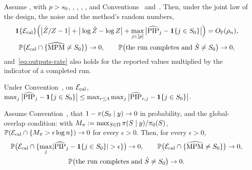 \begin{supprem}\label{thm:outputs}
Assume ,  with $p>s_0$, , , , , and Conventions~ and~. Then,
under the joint law of the design, the noise and the method's random numbers,
\begin{gather}
  \mathbf{1}\{\mathcal E_{\mathrm{cal}}\}\Big(\big|\hat Z/Z-1\big|+\big|\log\hat Z-\log Z\big|+\max_{j\in[p]}\big|\widehat{\mathrm{PIP}}_j-\mathbf{1}\{j\in S_0\}\big|\Big)
    =O_{\mathbb{P}}(\rho_n),\label{eq:outputs-rate}\\
  \mathbb{P}\big(\mathcal E_{\mathrm{cal}}\cap\{\widehat{\mathrm{MPM}}\neq S_0\}\big)\to0,\qquad \mathbb{P}\big(\text{the run completes and }\hat S\neq S_0\big)\to0,
    \label{eq:outputs-sel}
\end{gather}
and~\eqref{eq:outputs-rate} also holds for the reported values multiplied by the indicator of a completed run.
\end{supprem}


\begin{suppprop}\label{prop:worst-island}
Under Convention~, on $\mathcal E_{\mathrm{cal}}$,
$\max_j\big|\widehat{\mathrm{PIP}}_j-\mathbf{1}\{j\in S_0\}\big|\le\max_{r\le4}\max_j\big|\widehat{\mathrm{PIP}}_{r,j}-\mathbf{1}\{j\in S_0\}\big|$.
\end{suppprop}


\begin{supprem}\label{rem:alt-route}
Assume Convention~, that $1-\pi(S_0\mid y)\to0$ in probability, and the global-overlap condition: with
$M_\pi:=\max_{S\in\Omega}\pi(S\mid y)/\pi_0(S)$, $\mathbb{P}(\mathcal E_{\mathrm{cal}}\cap\{M_\pi>\epsilon\log n\})\to0$ for every $\epsilon>0$. Then, for
every $\epsilon>0$,
\begin{gather*}
  \mathbb{P}\big(\mathcal E_{\mathrm{cal}}\cap\{\max_j\lvert \widehat{\mathrm{PIP}}_j-\mathbf{1}\{j\in S_0\}\rvert>\epsilon\}\big)\to0,\qquad
  \mathbb{P}\big(\mathcal E_{\mathrm{cal}}\cap\{\widehat{\mathrm{MPM}}\neq S_0\}\big)\to0,\\
  \mathbb{P}\big(\text{the run completes and }\hat S\neq S_0\big)\to0 .
\end{gather*}
\end{supprem}

